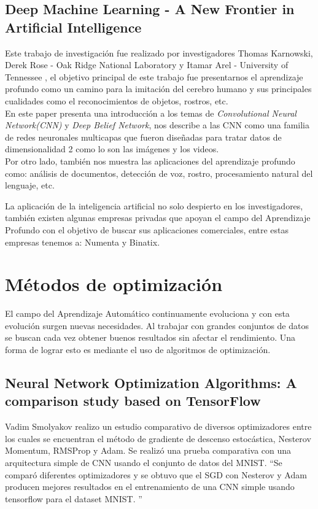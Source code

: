 \subsection{Deep Machine Learning - A New Frontier in Artificial Intelligence}
Este trabajo de investigación fue realizado por investigadores Thomas	Karnowski, Derek Rose - Oak Ridge National Laboratory y Itamar	Arel - University of Tennessee \cite{DML}, el objetivo principal de este trabajo fue presentarnos el aprendizaje profundo como un camino para la imitación del cerebro humano y sus principales cualidades como el reconocimientos de objetos, rostros, etc.\\
En este paper presenta una introducción a los temas de \textit{Convolutional Neural Network(CNN)} y \textit{Deep Belief Network}, nos describe a las CNN como una familia de redes neuronales multicapas que fueron diseñadas para tratar datos de dimensionalidad 2 como lo son las imágenes y los videos.\\
Por otro lado, también nos muestra las aplicaciones del aprendizaje profundo como: análisis de documentos, detección de voz, rostro, procesamiento natural del lenguaje, etc.

La aplicación de la inteligencia artificial no solo despierto en los investigadores, también existen algunas empresas privadas que apoyan el campo del Aprendizaje Profundo con el objetivo de buscar sus aplicaciones comerciales, entre estas empresas tenemos a: Numenta y Binatix.
\section{Métodos de optimización}
El campo del Aprendizaje Automático continuamente evoluciona y con esta evolución surgen nuevas necesidades. Al trabajar con grandes conjuntos de datos se buscan cada vez obtener buenos resultados sin afectar el rendimiento. Una forma de lograr esto es mediante el uso de algoritmos de optimización.
\subsection{Neural Network Optimization Algorithms: A comparison study based on TensorFlow}
Vadim Smolyakov\cite{WEBSITE:11} realizo un estudio comparativo de diversos optimizadores entre los cuales se encuentran el método de gradiente de descenso estocástica, Nesterov Momentum, RMSProp y Adam. Se realizó una prueba comparativa con una arquitectura simple de CNN usando el conjunto de datos del MNIST. \textquotedblleft Se comparó diferentes optimizadores y se obtuvo que el SGD con Nesterov y Adam producen mejores resultados en el entrenamiento de una CNN simple usando tensorflow para el dataset MNIST. \textquotedblright \cite{WEBSITE:11}
